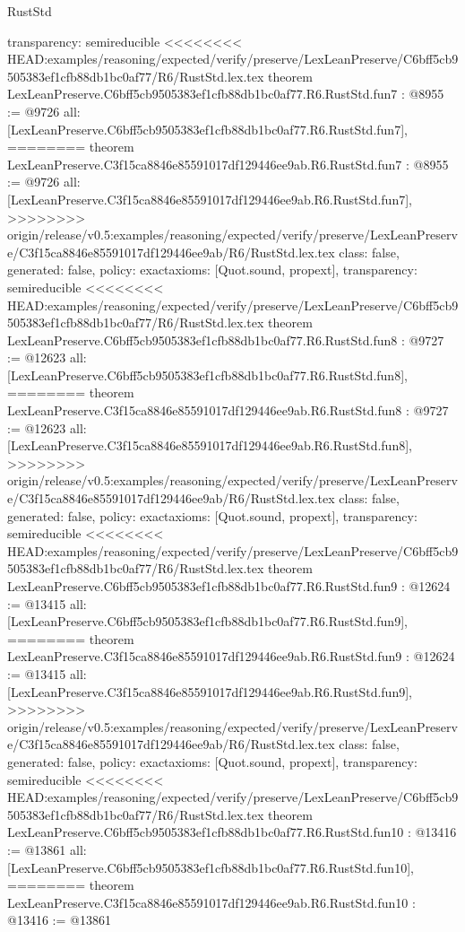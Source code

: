 \begin{lexlean}{RustStd}
\begin{coremodule}
{\begin{coremodule}
{{{{{{{{{{  transparency: semireducible
}
<<<<<<<< HEAD:examples/reasoning/expected/verify/preserve/LexLeanPreserve/C6bff5cb9505383ef1cfb88db1bc0af77/R6/RustStd.lex.tex
theorem LexLeanPreserve.C6bff5cb9505383ef1cfb88db1bc0af77.R6.RustStd.fun7 : @8955 := @9726 {
  all: [LexLeanPreserve.C6bff5cb9505383ef1cfb88db1bc0af77.R6.RustStd.fun7],
========
theorem LexLeanPreserve.C3f15ca8846e85591017df129446ee9ab.R6.RustStd.fun7 : @8955 := @9726 {
  all: [LexLeanPreserve.C3f15ca8846e85591017df129446ee9ab.R6.RustStd.fun7],
>>>>>>>> origin/release/v0.5:examples/reasoning/expected/verify/preserve/LexLeanPreserve/C3f15ca8846e85591017df129446ee9ab/R6/RustStd.lex.tex
  class: false,
  generated: false,
  policy: exact{axioms: [Quot.sound, propext]},
  transparency: semireducible
}
<<<<<<<< HEAD:examples/reasoning/expected/verify/preserve/LexLeanPreserve/C6bff5cb9505383ef1cfb88db1bc0af77/R6/RustStd.lex.tex
theorem LexLeanPreserve.C6bff5cb9505383ef1cfb88db1bc0af77.R6.RustStd.fun8 : @9727 := @12623 {
  all: [LexLeanPreserve.C6bff5cb9505383ef1cfb88db1bc0af77.R6.RustStd.fun8],
========
theorem LexLeanPreserve.C3f15ca8846e85591017df129446ee9ab.R6.RustStd.fun8 : @9727 := @12623 {
  all: [LexLeanPreserve.C3f15ca8846e85591017df129446ee9ab.R6.RustStd.fun8],
>>>>>>>> origin/release/v0.5:examples/reasoning/expected/verify/preserve/LexLeanPreserve/C3f15ca8846e85591017df129446ee9ab/R6/RustStd.lex.tex
  class: false,
  generated: false,
  policy: exact{axioms: [Quot.sound, propext]},
  transparency: semireducible
}
<<<<<<<< HEAD:examples/reasoning/expected/verify/preserve/LexLeanPreserve/C6bff5cb9505383ef1cfb88db1bc0af77/R6/RustStd.lex.tex
theorem LexLeanPreserve.C6bff5cb9505383ef1cfb88db1bc0af77.R6.RustStd.fun9 : @12624 := @13415 {
  all: [LexLeanPreserve.C6bff5cb9505383ef1cfb88db1bc0af77.R6.RustStd.fun9],
========
theorem LexLeanPreserve.C3f15ca8846e85591017df129446ee9ab.R6.RustStd.fun9 : @12624 := @13415 {
  all: [LexLeanPreserve.C3f15ca8846e85591017df129446ee9ab.R6.RustStd.fun9],
>>>>>>>> origin/release/v0.5:examples/reasoning/expected/verify/preserve/LexLeanPreserve/C3f15ca8846e85591017df129446ee9ab/R6/RustStd.lex.tex
  class: false,
  generated: false,
  policy: exact{axioms: [Quot.sound, propext]},
  transparency: semireducible
}
<<<<<<<< HEAD:examples/reasoning/expected/verify/preserve/LexLeanPreserve/C6bff5cb9505383ef1cfb88db1bc0af77/R6/RustStd.lex.tex
theorem LexLeanPreserve.C6bff5cb9505383ef1cfb88db1bc0af77.R6.RustStd.fun10 : @13416 := @13861 {
  all: [LexLeanPreserve.C6bff5cb9505383ef1cfb88db1bc0af77.R6.RustStd.fun10],
========
theorem LexLeanPreserve.C3f15ca8846e85591017df129446ee9ab.R6.RustStd.fun10 : @13416 := @13861 {
}}}}}}}}}}}}}}
\end{coremodule}}
\end{coremodule}
\end{lexlean}
